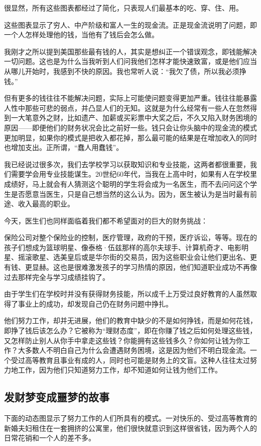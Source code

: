 很显然，所有这些图表都经过了简化，只表现人们最基本的吃、穿、住、用。

这些图表显示了穷人、中产阶级和富人一生的现金流。正是现金流说明了问题，即一个人怎样处理他的钱，当他有了钱后会怎么做。

我刚才之所以提到美国那些最有钱的人，其实是想纠正一个错误观念，即钱能解决一切问题。这也是为什么当我听到人们问我他们怎样才能快速致富，或是他们应当从哪儿开始时，我感到不快的原因。我也常听人说：“我欠了债，所以我必须挣钱。”

但有更多的钱往往不能解决问题，实际上可能使问题变得更加严重。钱往往能暴露人性中那些可悲的弱点，并凸显人们的无知。这就是为什么经常有一些人在忽然得到一大笔意外之财，比如遗产、加薪或买彩票中大奖之后，不久又陷入财务困境的原因——即便他们的财务状况会比之前好一些。钱只会让你头脑中的现金流的模式更加明显，如果你的模式是把收入都花掉，那么最可能的结果是在增加收入的同时也增加支出。正所谓，“蠢人用蠢钱”。

我已经说过很多次，我们去学校学习以获取知识和专业技能，这两者都很重要，我们需要学会用专业技能谋生。20世纪60年代，当我在上高中时，如果有人在学校里成绩好，马上就会有人猜测这个聪明的学生将会成为一名医生，而不去问问这个学生是否愿意当医生，只是自己想当然的这么认为。因为，医生被认为是当时最有前途、收入最高的职业。

今天，医生们也同样面临着我们都不希望面对的巨大的财务挑战：

保险公司对整个保险业的控制，医疗管理，政府的干预，医疗诉讼，等等。现在的孩子们想成为篮球明星、像泰格·伍兹那样的高尔夫球手、计算机奇才、电影明星、摇滚歌星、选美皇后或是华尔街的交易员，因为这些职业会让他们更出名、更有钱、更显赫。这也是很难激发孩子的学习热情的原因，他们知道职业成功不再像过去那样完全与学习成绩挂钩了。

由于学生们在学校时并没有获得财务技能，所以成千上万受过良好教育的人虽然取得了事业上的成功，却发现自己仍在财务问题中挣扎。

他们努力工作，却并无进展，他们的教育中缺少的不是如何挣钱，而是如何花钱，即挣了钱后该怎么办？它被称为“理财态度”，即在你赚了钱之后如何处理这些钱，又怎样防止别人从你手中拿走这些钱？你能拥有这些钱多久？你如何让钱为你工作？大多数人不明白自己为什么会遭遇财务困境，这是因为他们不明白现金流。一个受过高等教育且事业有成的人，同时也可能是财务上的文盲。这种人往往太过努力地工作，因为他们只知道努力工作，却不知道如何让钱为他们工作。

\subsection*{发财梦变成噩梦的故事}
下面的动态图显示了努力工作的人们所具有的模式。一对快乐的、受过高等教育的新婚夫妇租住在一套拥挤的公寓里，他们很快就意识到这样很省钱，因为两个人的日常花销和一个人的差不多。

